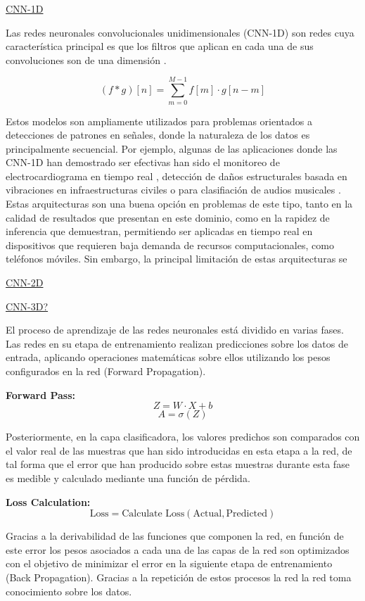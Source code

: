 \documentclass{uathesis-es}
\begin{document}
\underline{CNN-1D}

Las redes neuronales convolucionales unidimensionales (CNN-1D) son redes cuya característica principal es que los filtros que aplican en cada una de sus convoluciones son de una dimensión \cite{CNN1D}.

$$(f * g)[n] = \sum_{m=0}^{M-1} f[m] \cdot g[n-m]$$

Estos modelos son ampliamente utilizados para problemas orientados a detecciones de patrones en señales, donde la naturaleza de los datos es principalmente secuencial. Por ejemplo, algunas de las aplicaciones donde las CNN-1D han demostrado ser efectivas han sido el monitoreo de electrocardiograma en tiempo real \cite{Kiranyaz2017tt}, detección de daños estructurales basada en vibraciones en infraestructuras civiles \cite{khodabandehlou2019vibration} o para clasifiación de audios musicales \cite{allamy20211d}. Estas arquitecturas son una buena opción en problemas de este tipo, tanto en la calidad de resultados que presentan en este dominio, como en la rapidez de inferencia que demuestran, permitiendo ser aplicadas en tiempo real en dispositivos que requieren baja demanda de recursos computacionales, como teléfonos móviles. Sin embargo, la principal limitación de estas arquitecturas se 

\underline{CNN-2D}

\underline{CNN-3D?}


El proceso de aprendizaje de las redes neuronales está dividido en varias fases. Las redes en su etapa de entrenamiento realizan predicciones sobre los datos de entrada, aplicando operaciones matemáticas sobre ellos utilizando los pesos configurados en la red (Forward Propagation).

\textbf{Forward Pass:}
\[ Z = W \cdot X + b \]
\[ A = \sigma(Z) \]


Posteriormente, en la capa clasificadora, los valores predichos son comparados con el valor real de las muestras que han sido introducidas en esta etapa a la red, de tal forma que el error que han producido sobre estas muestras durante esta fase es medible y calculado mediante una función de pérdida.

\textbf{Loss Calculation:}
\[ \text{Loss} = \text{Calculate Loss}(\text{Actual}, \text{Predicted}) \]

Gracias a la derivabilidad de las funciones que componen la red, en función de este error los pesos asociados a cada una de las capas de la red son optimizados con el objetivo de minimizar el error en la siguiente etapa de entrenamiento (Back Propagation). Gracias a la repetición de estos procesos la red la red toma conocimiento sobre los datos.
\end{document}

